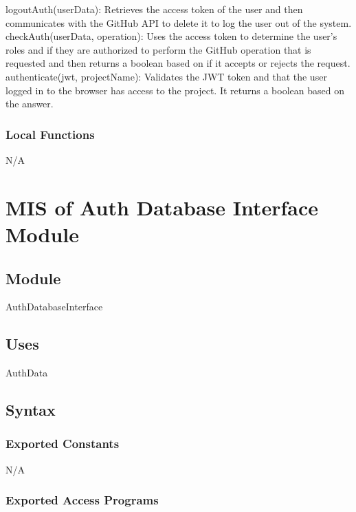 \documentclass[12pt, titlepage]{article}
\begin{document}
	\noindent logoutAuth(userData): Retrieves the access token of the user and then communicates with the GitHub API to delete it to log the user out of the system. \\
	
	\noindent checkAuth(userData, operation): Uses the access token to determine the user’s roles and if they are authorized to perform the GitHub operation that is requested and then returns a boolean based on if it accepts or rejects the request. \\
	
	\noindent authenticate(jwt, projectName): Validates the JWT token and that the user logged in to the browser has access to the project. It returns a boolean based on the answer. \\
	
	\subsubsection{Local Functions}
	
	N/A
	
	\newpage
	
	\section{MIS of Auth Database Interface Module} \label{Module} 
	
	\subsection{Module}
	AuthDatabaseInterface
	
	\subsection{Uses}
	AuthData
	
	\subsection{Syntax}
	
	\subsubsection{Exported Constants}
	N/A
	
	\subsubsection{Exported Access Programs}
	
\end{document}
